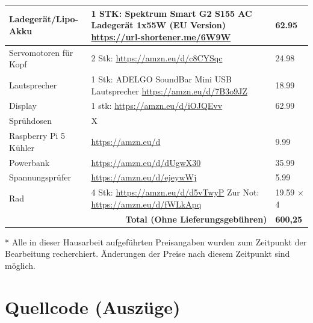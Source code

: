 \begin{longtable}{|p{4cm}|p{7cm}|p{2.5cm}|}
	Ladegerät/Lipo-Akku & 1 STK: Spektrum Smart G2 S155 AC Ladegerät 1x55W (EU Version) \newline \url{https://url-shortener.me/6W9W} & 62.95 \\
	\hline
	
	Servomotoren für Kopf & 2 Stk: \url{https://amzn.eu/d/c8CYSqc} & 24.98 \\
	\hline
	
	Lautsprecher & 1 Stk: ADELGO SoundBar Mini USB Lautsprecher \newline \url{https://amzn.eu/d/7B3o9JZ} & 18.99 \\
	\hline
	
	Display & 1 stk: \url{https://amzn.eu/d/iOJQEvv} & 62.99 \\
	\hline
	
	Sprühdosen & X & \\
	\hline
	
	Raspberry Pi 5 Kühler & \url{https://amzn.eu/d} & 9.99 \\
	\hline
	
	Powerbank & \url{https://amzn.eu/d/dUgwX30} & 35.99 \\
	\hline
	
	Spannungsprüfer & \url{https://amzn.eu/d/ejeywWj} & 5.99 \\
	\hline
	
	Rad & 4 Stk: \url{https://amzn.eu/d/d5vTwyP} \newline Zur Not: \url{https://amzn.eu/d/fWLkApq} & 19.59 $\times$ 4 \\
	\hline
	
	\multicolumn{2}{|r|}{\textbf{Total (Ohne Lieferungsgebühren)}} & \textbf{600,25} \\
	\hline
	
\end{longtable}

* Alle in dieser Hausarbeit aufgeführten Preisangaben wurden zum Zeitpunkt der Bearbeitung recherchiert. Änderungen der Preise nach diesem Zeitpunkt sind möglich.




\chapter{Quellcode (Auszüge)}

%	

